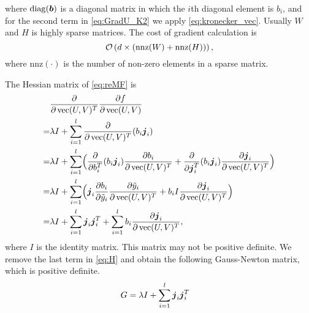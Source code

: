 where $\operatorname*{diag}(\boldsymbol{b})$ is a diagonal matrix in which the $i$th diagonal element is $b_i$, and for the second term in \eqref{eq:GradU_K2} we apply \eqref{eq:kronecker_vec}. 
Usually $W$ and $H$ is highly sparse matrices. The cost of gradient calculation is
\begin{equation*}
\mathcal{O}\left(d\times (\text{nnz}(W)+\text{nnz}(H))\right),
\end{equation*}
where $\text{nnz}(\cdot)$ is the number of non-zero elements in a sparse matrix.
\par
{}
The Hessian matrix of \eqref{eq:reMF} is 
\begin{align}
\begin{aligned}
&\frac{\partial }{\partial \operatorname*{vec}(U,V)^T} \frac{\partial f}{\partial \operatorname*{vec}(U,V)}\\
=&\lambda I + \sum_{i=1}^{l}\frac{\partial }{\partial \operatorname*{vec}(U,V)^T} (b_i \boldsymbol{j}_i)\\
=&\lambda I + \sum_{i=1}^{l} \Bigl( \frac{\partial }{\partial b_i^T} (b_i \boldsymbol{j}_i) \frac{\partial b_i}{\partial \operatorname*{vec}(U,V)^T} + \frac{\partial }{\partial \boldsymbol{j}_i^T} (b_i \boldsymbol{j}_i) \frac{\partial \boldsymbol{j}_i}{\partial \operatorname*{vec}(U,V)^T} \Bigr)\\
=&\lambda I + \sum_{i=1}^{l} \Bigl( \boldsymbol{j}_i \frac{\partial b_i}{\partial \tilde{y}_i} \frac{\partial \tilde{y}_i}{\partial \operatorname*{vec}(U,V)^T} + b_i I \frac{\partial \boldsymbol{j}_i}{\partial \operatorname*{vec}(U,V)^T} \Bigr)\\
=&\lambda I + \sum_{i=1}^{l} \boldsymbol{j}_i \boldsymbol{j}_i^T + \sum_{i=1}^{l} b_i \frac{\partial \boldsymbol{j}_i}{\partial \operatorname*{vec}(U,V)^T}, 
	\label{eq:H}
\end{aligned}
\end{align}
where $I$ is the identity matrix. This matrix may not be positive definite.
We remove the last term in \eqref{eq:H} and obtain the following Gauss-Newton matrix, which is positive definite.
\begin{equation}
    \begin{aligned}
    G &= \lambda I + \sum_{i=1}^{l}\boldsymbol{j}_i\boldsymbol{j}_i^T
    \label{eq:G}
    \end{aligned}
\end{equation}

